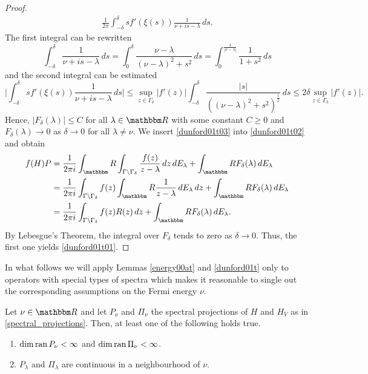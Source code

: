 \begin{proof}
\begin{equation*}
\begin{split}
       \frac{1}{2\pi}  \int_{-\delta}^\delta s f'(\xi(s))\frac{1}{\nu+is-\lambda}\, ds .
\end{split}
\end{equation*}
The first integral can be rewritten
\begin{equation*}
  \int_{-\delta}^\delta \frac{1}{\nu+is-\lambda}\, ds
     =  \int_0^\delta  \frac{\nu-\lambda}{(\nu-\lambda)^2+s^2}\, ds
     =  \int_0^{\frac{\delta}{|\nu-\lambda|}} \frac{1}{1+s^2}\, ds
\end{equation*}
and the second integral can be estimated
\begin{equation*}
 \big|  \int_{-\delta}^\delta s f'(\xi(s))\frac{1}{\nu+is-\lambda}\, ds \big|
   \leq \sup_{z\in\Gamma_\delta}|f'(z)| \int_{-\delta}^\delta \frac{|s|}{((\nu-\lambda)^2+s^2)^{\frac{1}{2}}}\, ds
   \leq 2\delta \sup_{z\in\Gamma_\delta}|f'(z)| .
\end{equation*}
Hence, $|F_\delta(\lambda)|\leq C$ for all $\lambda\in\R$ with some constant $C\geq 0$
and $F_\delta(\lambda)\to 0$ as $\delta\to 0$ for all $\lambda\neq\nu$. We insert \eqref{dunford01t03}
into \eqref{dunford01t02} and obtain
\begin{equation*}
\begin{split}
  f(H)P & = \frac{1}{2\pi i} \int_\R \int_{\Gamma\setminus\Gamma_\delta} \frac{f(z)}{z-\lambda}\, dz\, dE_\lambda +
          \int_\R F_\delta(\lambda)\, dE_\lambda \\
        & = \frac{1}{2\pi i} \int_{\Gamma\setminus\Gamma_\delta} f(z) \int_\R \frac{1}{z-\lambda}\, dE_\lambda\, dz
             +  \int_\R F_\delta(\lambda)\, dE_\lambda\\
        & = \frac{1}{2\pi i} \int_{\Gamma\setminus\Gamma_\delta} f(z) R(z)\, dz
             +  \int_\R F_\delta(\lambda)\, dE_\lambda .
\end{split}
\end{equation*}
By Lebesgue's Theorem, the integral over $F_\delta$ tends to zero as $\delta\to 0$. 
Thus, the first one yields \eqref{dunford01t01}.
\end{proof}

In what follows we will apply Lemmas \ref{energy00at} and \ref{dunford01t} only to operators
with special types of spectra which makes it reasonable to
single out the corresponding assumptions on the Fermi energy $\nu$.

\begin{hypothesis}\label{h2}
Let $\nu\in\R$ and let $P_\nu$ and $\Pi_\nu$ the spectral projections of $H$ and $H_V$ as in \eqref{spectral_projections}.
Then, at least one of the following holds true.
\begin{enumerate}
\item $\dim\operatorname{ran} P_\nu<\infty$ and $\dim\operatorname{ran}\Pi_\nu<\infty$.
\item $P_\lambda$ and $\Pi_\lambda$ are continuous in a neighbourhood of $\nu$.
\end{enumerate}
\end{hypothesis}

